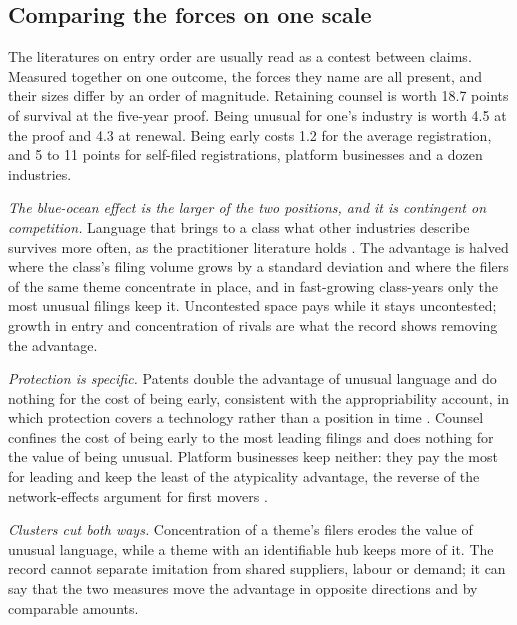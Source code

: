 
\subsection*{Comparing the forces on one scale}

The literatures on entry order are usually read as a contest between
claims. Measured together on one outcome, the forces they name are all
present, and their sizes differ by an order of magnitude. Retaining
counsel is worth 18.7 points of survival at the five-year proof. Being
unusual for one's industry is worth 4.5 at the proof and 4.3 at
renewal. Being early costs 1.2 for the average registration, and 5 to 11
points for self-filed registrations, platform businesses and a dozen
industries.

\emph{The blue-ocean effect is the larger of the two positions, and it is
contingent on competition.} Language that brings to a class what other
industries describe survives more often, as the practitioner literature
holds \citep{KimMauborgne2004}. The advantage is halved where the
class's filing volume grows by a standard deviation and where the filers
of the same theme concentrate in place, and in fast-growing class-years
only the most unusual filings keep it. Uncontested space pays while it
stays uncontested; growth in entry and concentration of rivals are what
the record shows removing the advantage.

\emph{Protection is specific.} Patents double the advantage of unusual
language and do nothing for the cost of being early, consistent with the
appropriability account, in which protection covers a technology rather
than a position in time \citep{Teece1986}. Counsel
confines the cost of being early to the most leading filings and does nothing for the value of being
unusual. Platform businesses keep neither: they pay the most for leading
and keep the least of the atypicality advantage, the reverse of the
network-effects argument for first movers \citep{LiebermanMontgomery1988}.

\emph{Clusters cut both ways.} Concentration of a theme's filers erodes
the value of unusual language, while a theme with an identifiable hub
keeps more of it. The record cannot separate imitation from shared
suppliers, labour or demand; it can say that the two measures move the
advantage in opposite directions and by comparable amounts.

